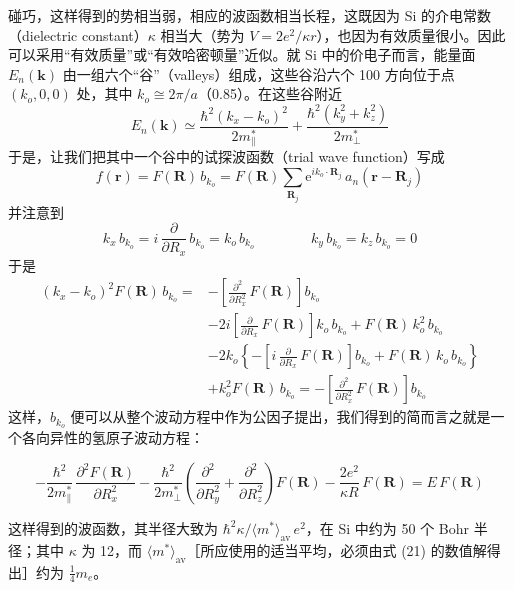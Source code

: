 碰巧，这样得到的势相当弱，相应的波函数相当长程，这既因为 Si 的介电常数（dielectric constant）$\kappa$ 相当大（势为 $V = 2e^2/\kappa r$），也因为有效质量很小。因此可以采用“有效质量”或“有效哈密顿量”近似。就 Si 中的价电子而言，能量面 $E_n(\mathbf{k})$ 由一组六个“谷”（valleys）组成，这些谷沿六个 100 方向位于点 $(k_o, 0, 0)$ 处，其中 $k_o \cong 2\pi/a$（0.85）。在这些谷附近
\begin{equation*}
E_n(\mathbf{k}) \simeq \frac{\hbar^2 (k_x - k_o)^2}{2m^*_{\parallel}} + \frac{\hbar^2 (k_y^2 + k_z^2)}{2m^*_{\perp}}
\end{equation*}
于是，让我们把其中一个谷中的试探波函数（trial wave function）写成
\begin{equation*}
f(\mathbf{r}) = F(\mathbf{R})\, b_{k_o} = F(\mathbf{R}) \sum_{\mathbf{R}_j} \mathrm{e}^{i k_o \cdot \mathbf{R}_j}\, a_n(\mathbf{r} - \mathbf{R}_j) \tag{20}
\end{equation*}
并注意到
\begin{equation*}
k_x\, b_{k_o} = i\,\frac{\partial}{\partial R_x}\, b_{k_o} = k_o\, b_{k_o} \qquad\qquad k_y\, b_{k_o} = k_z\, b_{k_o} = 0
\end{equation*}
于是
\begin{align*}
(k_x - k_o)^2 F(\mathbf{R})\, b_{k_o} ={}& -\left[\frac{\partial^2}{\partial R_x^2}\, F(\mathbf{R})\right] b_{k_o} \\
&- 2i\left[\frac{\partial}{\partial R_x}\, F(\mathbf{R})\right] k_o\, b_{k_o} + F(\mathbf{R})\, k_o^2\, b_{k_o} \\
&- 2k_o \left\{ -\left[i\,\frac{\partial}{\partial R_x}\, F(\mathbf{R})\right] b_{k_o} + F(\mathbf{R})\, k_o\, b_{k_o} \right\} \\
&+ k_o^2 F(\mathbf{R})\, b_{k_o} = -\left[\frac{\partial^2}{\partial R_x^2}\, F(\mathbf{R})\right] b_{k_o}
\end{align*}
这样，$b_{k_o}$ 便可以从整个波动方程中作为公因子提出，我们得到的简而言之就是一个各向异性的氢原子波动方程：


\begin{equation*}
-\frac{\hbar^2}{2m^*_{\parallel}}\, \frac{\partial^2 F(\mathbf{R})}{\partial R_x^2} - \frac{\hbar^2}{2m^*_{\perp}} \left(\frac{\partial^2}{\partial R_y^2} + \frac{\partial^2}{\partial R_z^2}\right) F(\mathbf{R}) - \frac{2e^2}{\kappa R}\, F(\mathbf{R}) = E\, F(\mathbf{R}) \tag{21}
\end{equation*}

这样得到的波函数，其半径大致为 $\hbar^2 \kappa / \langle m^* \rangle_{\text{av}}\, e^2$，在 Si 中约为 50 个 Bohr 半径；其中 $\kappa$ 为 12，而 $\langle m^* \rangle_{\text{av}}$［所应使用的适当平均，必须由式 (21) 的数值解得出］约为 $\frac{1}{4} m_e$。

